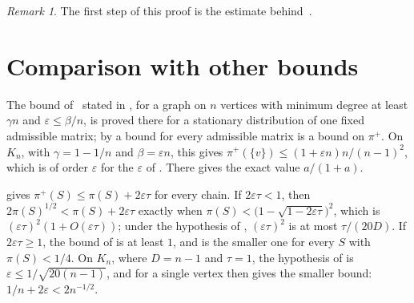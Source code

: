 \documentclass[11pt]{article}
\theoremstyle{remark}
\newtheorem{remark}[theorem]{Remark}
\theoremstyle{plain}
\begin{document}
\begin{remark}\label{rem:mix}
The first step of this proof is the estimate behind~\cite[Proposition~2.12]{Zu}.
\end{remark}

\section{Comparison with other bounds}\label{sec:compare}

The bound of~\cite[Proposition~4.7]{HSS} stated in , for a graph on $n$ vertices with minimum degree
at least $\gamma n$ and $\varepsilon\le\beta/n$, is proved there for a stationary distribution of one fixed admissible
matrix; by  a bound for every admissible matrix is a bound on $\pi^+$. On $K_n$, with $\gamma=1-1/n$ and $\beta=\varepsilon n$, this gives
$\pi^+(\{v\})\le(1+\varepsilon n)n/(n-1)^2$, which is of order $\varepsilon$ for the $\varepsilon$ of
. There  gives the exact value $a/(1+a)$.

 gives $\pi^+(S)\le\pi(S)+2\varepsilon\tau$ for every chain. If $2\varepsilon\tau<1$, then
$2\pi(S)^{1/2}<\pi(S)+2\varepsilon\tau$ exactly when $\pi(S)<\bigl(1-\sqrt{1-2\varepsilon\tau}\bigr)^2$, which is
$(\varepsilon\tau)^2(1+O(\varepsilon\tau))$; under the hypothesis of , $(\varepsilon\tau)^2$ is at most
$\tau/(20D)$. If $2\varepsilon\tau\ge1$, the bound of  is at least $1$, and  is the
smaller one for every $S$ with $\pi(S)<1/4$. On $K_n$, where $D=n-1$ and $\tau=1$, the hypothesis of 
is $\varepsilon\le1/\sqrt{20(n-1)}$, and for a single vertex  then gives the smaller bound:
$1/n+2\varepsilon<2n^{-1/2}$.
\end{document}
